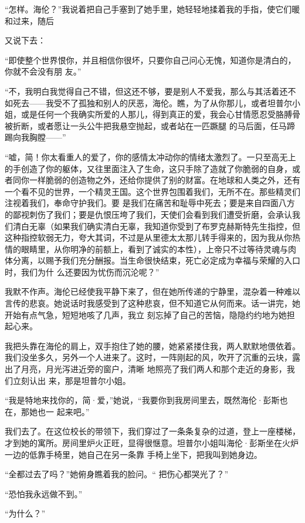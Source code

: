 \documentclass{article}
\begin{document}
“怎样。海伦？”我说着把自己手塞到了她手里，她轻轻地揉着我的手指，使它们暖和过来，随后
\newpage

又说下去： 

“即使整个世界恨你，并且相信你很坏，只要你自己问心无愧，知道你是清白的，你就不会没有朋
友。” 

“不，我明白我觉得自己不错，但这还不够，要是别人不爱我，那么与其活着还不如死去——我受不了孤独和别人的厌恶，海伦。瞧，为了从你那儿，或者坦普尔小姐，或是任何一个我确实所爱的人那儿，得到真正的爱，我会心甘情愿忍受胳膊骨被折断，或者愿让一头公牛把我悬空抛起，或者站在一匹蹶腿
的马后面，任马蹄踢向我胸膛——” 

“嘘，简！你太看重人的爱了，你的感情太冲动你的情绪太激烈了。一只至高无上的手创造了你的躯体，又往里面注入了生命，这只手除了造就了你脆弱的自身，或者同你一样脆弱的创造物之外，还给你提供了别的财富。在地球和人类之外，还有一个看不见的世界，一个精灵王国。这个世界包围着我们，无所不在。那些精灵们注视着我们，奉命守护我们。要
\newpage
是我们在痛苦和耻辱中死去；要是来自四面八方的鄙视刺伤了我们；要是仇恨压垮了我们，天使们会看到我们遭受折磨，会承认我们清白无辜（如果我们确实清白无辜，我知道你受到了布罗克赫斯特先生指控，但这种指控软弱无力，夸大其词，不过是从里德太太那儿转手得来的，因为我从你热情的眼睛里，从你明净的前额上，看到了诚实的本性），上帝只不过等待灵魂与肉体分离，以赐予我们充分酬报。当生命很快结束，死亡必定成为幸福与荣耀的入口时，我们为什
么还要因为忧伤而沉沦呢？” 

我默不作声。海伦已经使我平静下来了，但在她所传递的宁静里，混杂着一种难以言传的悲哀。她说话时我感受到了这种悲哀，但不知道它从何而来。话一讲完，她开始有点气急，短短地咳了几声，我立
刻忘掉了自己的苦恼，隐隐约约地为她担起心来。 

我把头靠在海伦的肩上，双手抱住了她的腰，她紧紧搂住我，两人默默地偎依着。我们没坐多久，另外一个人进来了。这时，一阵刚起的风，吹开了沉重的云块，露出了月亮，月光泻进近旁的窗户，清晰
\newpage
地照亮了我们两人和那个走近的身影，我们立刻认出
来，那是坦普尔小姐。 

“我是特地来找你的，简·爱，”她说，“我要你到我房间里去，既然海伦·彭斯也在，那她也一
起来吧。” 

我们去了。在这位校长的带领下，我们穿过了一条条复杂的过道，登上一座楼梯，才到她的寓所。房间里炉火正旺，显得很惬意。坦普尔小姐叫海伦·彭斯坐在火炉一边的低靠手椅里，她自己在另一条靠
手椅上坐下，把我叫到她身边。 

“全都过去了吗？”她俯身瞧着我的脸问。“
把伤心都哭光了？” 


“恐怕我永远做不到。” 


“为什么？” 
\end{document}
